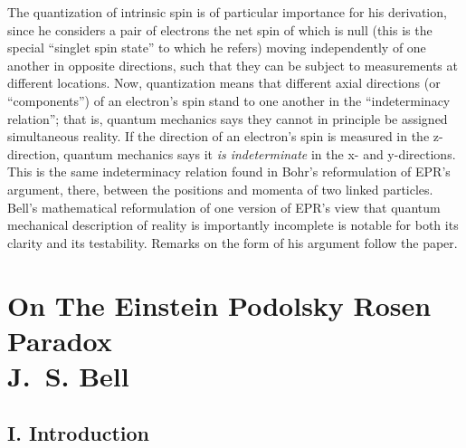 The quantization of intrinsic spin is of particular importance for his derivation, since he considers a pair of electrons the net spin of which is null (this is the special ``singlet spin state'' to which he refers) moving independently of one another in opposite directions, such that they can be subject to measurements at different locations. Now, quantization means that different axial directions (or ``components'') of an electron's
spin stand to one another in the ``indeterminacy relation''; that is, quantum mechanics says they cannot
in principle be assigned simultaneous reality. If the direction of an electron's spin is measured in the z-direction, quantum mechanics says it \emph{is indeterminate} in the x- and y-directions. This is the same indeterminacy relation found in Bohr's reformulation of EPR's argument, there, between the positions and momenta of two linked particles. Bell's mathematical reformulation of one version of EPR's view that quantum mechanical description of reality is importantly incomplete is notable for both its clarity and its testability. Remarks on the form of his argument follow the paper.

\section*{On The Einstein Podolsky Rosen Paradox\\
	{\large J.~S. Bell}}

\subsection*{I. Introduction}

